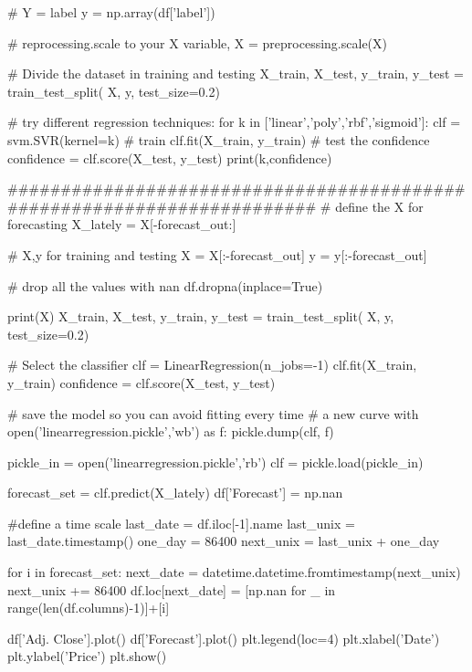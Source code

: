 \documentclass[11pt]{article}
\begin{document}
\begin{python}
# Y = label
y = np.array(df['label'])

# reprocessing.scale to your X variable,
X = preprocessing.scale(X)

# Divide the dataset in training and testing
X_train, X_test, y_train, y_test = train_test_split(
    X, y, test_size=0.2)

# try different regression techniques:
for k in ['linear','poly','rbf','sigmoid']:
    clf = svm.SVR(kernel=k)
    # train
    clf.fit(X_train, y_train)
    # test the confidence
    confidence = clf.score(X_test, y_test)
    print(k,confidence)

########################################################################
# define the X for forecasting
X_lately = X[-forecast_out:]

# X,y for training and testing
X = X[:-forecast_out]
y = y[:-forecast_out]

# drop all the values with nan
df.dropna(inplace=True)

print(X)
X_train, X_test, y_train, y_test = train_test_split(
    X, y, test_size=0.2)

# Select the classifier
clf = LinearRegression(n_jobs=-1)
clf.fit(X_train, y_train)
confidence = clf.score(X_test, y_test)

# save the model so you can avoid fitting every time
# a new curve
with open('linearregression.pickle','wb') as f:
    pickle.dump(clf, f)

pickle_in = open('linearregression.pickle','rb')
clf = pickle.load(pickle_in)

forecast_set = clf.predict(X_lately)
df['Forecast'] = np.nan

#define a time scale
last_date = df.iloc[-1].name
last_unix = last_date.timestamp()
one_day = 86400
next_unix = last_unix + one_day

for i in forecast_set:
    next_date = datetime.datetime.fromtimestamp(next_unix)
    next_unix += 86400
    df.loc[next_date] = [np.nan for _ in
                         range(len(df.columns)-1)]+[i]

df['Adj. Close'].plot()
df['Forecast'].plot()
plt.legend(loc=4)
plt.xlabel('Date')
plt.ylabel('Price')
plt.show()
\end{python}{}
\clearpage
\end{document}
